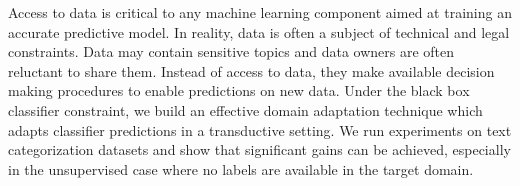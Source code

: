 Access to data is critical to any machine learning component aimed at training an accurate predictive model. In reality, data is often a subject of technical and legal constraints. Data may contain sensitive topics and data owners are often reluctant to share them. Instead of access to data, they make available decision making procedures to enable predictions on new data. Under the black box classifier constraint, we build an effective domain adaptation technique which adapts classifier predictions in a transductive setting. We run experiments on text categorization datasets and show that significant gains can be achieved, especially in the unsupervised case where no labels are available in the target domain.
